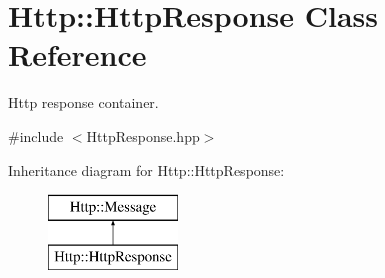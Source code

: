 \hypertarget{classHttp_1_1HttpResponse}{}\section{Http\+::Http\+Response Class Reference}
\label{classHttp_1_1HttpResponse}


Http response container.  




{\ttfamily \#include $<$Http\+Response.\+hpp$>$}

Inheritance diagram for Http\+::Http\+Response\+:\begin{figure}[H]
\begin{center}
\leavevmode
\includegraphics[height=2.000000cm]{classHttp_1_1HttpResponse}
\end{center}
\end{figure}
